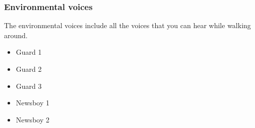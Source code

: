 \subsubsection*{Environmental voices}
The environmental voices include all the voices that you can hear while walking around.
\begin{itemize}
	\item Guard 1
	\item Guard 2
	\item Guard 3
	\item Newsboy 1
	\item Newsboy 2
\end{itemize}